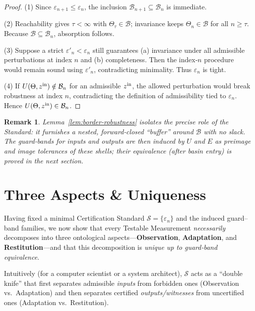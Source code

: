 \documentclass[12pt]{article}
\newtheorem{remark}{Remark}[section]
\begin{document}
\begin{proof}
(1) Since \(\varepsilon_{n+1}\le\varepsilon_n\), the inclusion \(\mathcal B_{n+1}\subseteq\mathcal B_n\) is immediate.

(2) Reachability gives \(\tau<\infty\) with \(\Theta_\tau\in\mathcal B\); invariance keeps \(\Theta_n\in\mathcal B\) for all \(n\ge\tau\).  Because \(\mathcal B\subseteq\mathcal B_n\), absorption follows.

(3) Suppose a strict \(\varepsilon'_n<\varepsilon_n\) still guarantees (a) invariance under all admissible perturbations at index \(n\) and (b) completeness.  Then the index‑\(n\) procedure would remain sound using \(\varepsilon'_n\), contradicting minimality.  Thus \(\varepsilon_n\) is tight.

(4) If \(U(\Theta,z^{\rm in})\notin\mathcal B_n\) for an admissible \(z^{\rm in}\), the allowed perturbation would break robustness at index \(n\), contradicting the definition of admissibility tied to \(\varepsilon_n\).  Hence \(U(\Theta,z^{\rm in})\in\mathcal B_n\).
\end{proof}

\begin{remark}
Lemma~\ref{lem:border-robustness} isolates the precise role of the Standard: it furnishes a nested, forward‑closed “buffer” around \(\mathcal B\) with no slack.  The guard‑bands for inputs and outputs are then induced by \(U\) and \(E\) as preimage and image tolerances of these shells; their equivalence (after basin entry) is proved in the next section.
\end{remark}

\section{Three Aspects \& Uniqueness}
\label{sec:three-aspects}

Having fixed a minimal Certification Standard $\mathcal S=\{\varepsilon_n\}$ and the induced guard–band families, we now show that every Testable Measurement \emph{necessarily} decomposes into three ontological aspects—\textbf{Observation}, \textbf{Adaptation}, and \textbf{Restitution}—and that this decomposition is \emph{unique up to guard‑band equivalence}.  

Intuitively (for a computer scientist or a system architect), $\mathcal S$ acts as a “double knife” that first separates admissible \emph{inputs} from forbidden ones (Observation vs.\ Adaptation) and then separates certified \emph{outputs/witnesses} from uncertified ones (Adaptation vs.\ Restitution).
\end{document}
